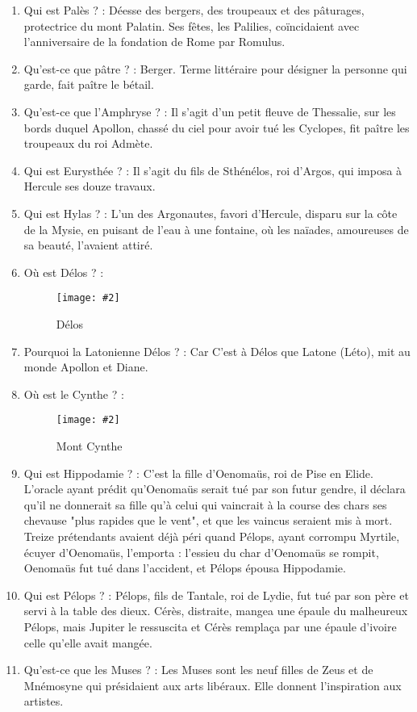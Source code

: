 \documentclass[a4paper, 11pt, hidelinks]{article}
\newcommand{\img}[4]{\begin{figure}[!ht]
    \centering
    \texttt{[image: \#2]}
    \caption{#3}
    \label{#4}
    \end{figure} }
\begin{document}
\begin{enumerate}
      \item Qui est Palès ? : Déesse des bergers, des troupeaux et des pâturages, protectrice du mont Palatin. Ses fêtes, les Palilies, coïncidaient avec l'anniversaire de la fondation de Rome par Romulus.
      \item Qu'est-ce que pâtre ? : Berger. Terme littéraire pour désigner la personne qui garde, fait paître le bétail.
      \item Qu'est-ce que l'Amphryse ? : Il s'agit d'un petit fleuve de Thessalie, sur les bords duquel Apollon, chassé du ciel pour avoir tué les Cyclopes, fit paître les troupeaux
            du roi Admète.
      \item Qui est Eurysthée ? : Il s'agit du fils de Sthénélos, roi d'Argos, qui imposa à Hercule ses douze travaux.
      \item Qui est Hylas ? : L'un des Argonautes, favori d'Hercule, disparu sur la côte de la Mysie, en puisant de l'eau à une fontaine, où les naïades, amoureuses de sa beauté, l'avaient attiré.
      \item Où est Délos ? :
            \img{0.3}{Délos.png}{Délos}{109}
            \newpage
      \item Pourquoi la Latonienne Délos ? : Car C'est à Délos que Latone (Léto), mit au monde Apollon et Diane.
      \item Où est le Cynthe ? : 
            \img{0.4}{Cynthe.png}{Mont Cynthe}{110}
      \item Qui est Hippodamie ? : C'est la fille d'Oenomaüs, roi de Pise en Elide. L'oracle ayant prédit qu'Oenomaüs serait tué par son futur gendre, il déclara qu'il ne donnerait 
            sa fille qu'à celui qui vaincrait à la course des chars ses chevause "plus rapides que le vent", et que les vaincus seraient mis à mort. Treize prétendants avaient déjà
            péri quand Pélops, ayant corrompu Myrtile, écuyer d'Oenomaüs, l'emporta : l'essieu du char d'Oenomaüs se rompit, Oenomaüs fut tué dans l'accident, et Pélops épousa Hippodamie.
      \item Qui est Pélops ? : Pélops, fils de Tantale, roi de Lydie, fut tué par son père et servi à la table des dieux. Cérès, distraite, mangea une épaule du malheureux Pélops, 
            mais Jupiter le ressuscita et Cérès remplaça par une épaule d'ivoire celle qu'elle avait mangée.
      \item Qu'est-ce que les Muses ? : Les Muses sont les neuf filles de Zeus et de Mnémosyne qui présidaient aux arts libéraux. Elle donnent l'inspiration aux artistes.

\end{enumerate}
\end{document}

